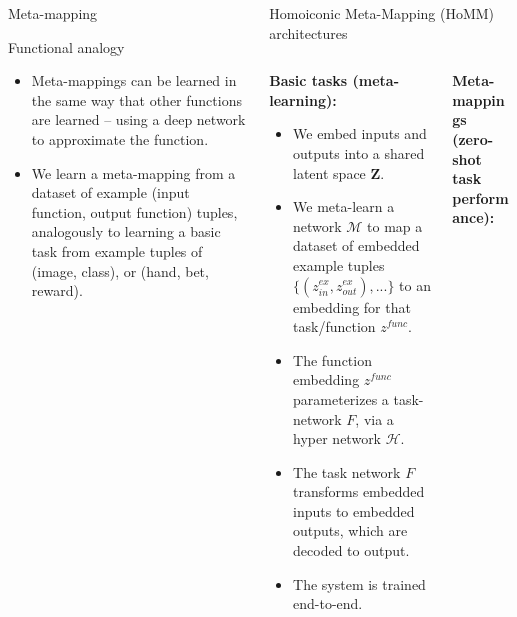 \documentclass[final]{beamer}
\begin{document}
\begin{frame}[t]{}
\begin{columns}
\begin{column}[t]{0.248\textwidth}
\begin{block}{\huge Meta-mapping}
\begin{itemize}
\end{itemize}
\end{block}
\begin{block}{\huge Functional analogy}
\vspace{-0.6em}
\begin{itemize}
\item Meta-mappings can be learned in the same way that other functions are learned -- using a deep network to approximate the function.
\item We learn a meta-mapping from a dataset of example (input function, output function) tuples, analogously to learning a basic task from example tuples of (image, class), or (hand, bet, reward). 
\end{itemize}
\end{block}
\end{column}

\begin{column}[t]{0.496\textwidth}
\begin{block}{\huge Homoiconic Meta-Mapping (HoMM) architectures}
\vspace{-0.5em}
\begin{columns}
\begin{column}[t]{0.48\textwidth}
\textbf{Basic tasks (meta-learning):}
\begin{itemize}
\item We embed inputs and outputs into a shared latent space \(\bm Z\). 
\item We meta-learn a network \(\mathcal{M}\) to map a dataset of embedded example tuples \(\{(z^{ex}_{in}, z^{ex}_{out}), ...\}\) to an embedding for that task/function \(z^{func}\). 
\item The function embedding \(z^{func}\) parameterizes a task-network \(F\), via a hyper network \(\mathcal{H}\).
\item The task network \(F\) transforms embedded inputs to embedded outputs, which are decoded to output.
\item The system is trained end-to-end.
\end{itemize}
\end{column}
\begin{column}[t]{0.48\textwidth}
\textbf{Meta-mappings (zero-shot task performance):}
\end{column}
\end{columns}

\begin{figure}[H]
\centering
\normalsize
{}
\end{figure}
\end{block}
\end{column}
\end{columns}
\end{frame}
\end{document}
